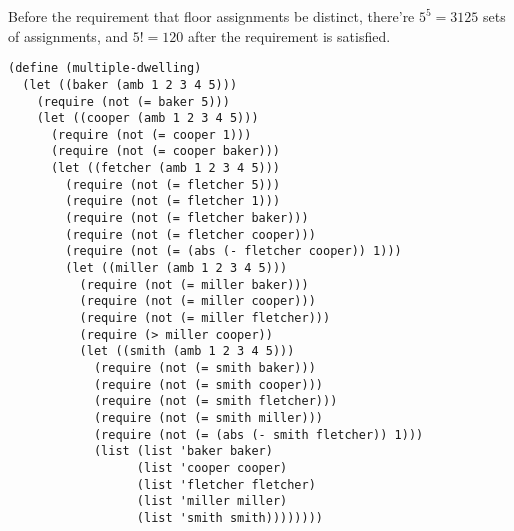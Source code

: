 \documentclass[a4paper,12pt]{article}
\begin{document}
Before the requirement that floor assignments be distinct, there're
$5^5 = 3125$ sets of assignments, and $5! = 120$ after the requirement
is satisfied.

\begin{lstlisting}
(define (multiple-dwelling)
  (let ((baker (amb 1 2 3 4 5)))
    (require (not (= baker 5)))
    (let ((cooper (amb 1 2 3 4 5)))
      (require (not (= cooper 1)))
      (require (not (= cooper baker)))
      (let ((fetcher (amb 1 2 3 4 5)))
        (require (not (= fletcher 5)))
        (require (not (= fletcher 1)))
        (require (not (= fletcher baker)))
        (require (not (= fletcher cooper)))
        (require (not (= (abs (- fletcher cooper)) 1)))
        (let ((miller (amb 1 2 3 4 5)))
          (require (not (= miller baker)))
          (require (not (= miller cooper)))
          (require (not (= miller fletcher)))
          (require (> miller cooper))
          (let ((smith (amb 1 2 3 4 5)))
            (require (not (= smith baker)))
            (require (not (= smith cooper)))
            (require (not (= smith fletcher)))
            (require (not (= smith miller)))
            (require (not (= (abs (- smith fletcher)) 1)))
            (list (list 'baker baker)
                  (list 'cooper cooper)
                  (list 'fletcher fletcher)
                  (list 'miller miller)
                  (list 'smith smith))))))))
\end{lstlisting}
\end{document}
